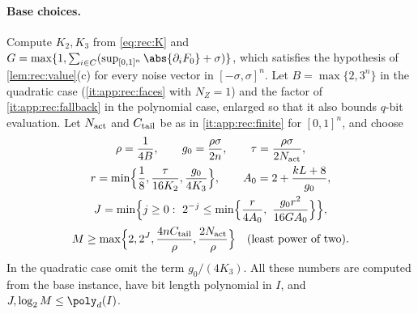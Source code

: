\paragraph{Base choices.}
Compute $K_2,K_3$ from \eqref{eq:rec:K} and
$G=\max\{1,\sum_{i\in C}(\sup_{[0,1]^n}\abs{\partial_iF_0}+\sigma)\}$, which
satisfies the hypothesis of \cref{lem:rec:value}(c) for every noise vector
in $[-\sigma,\sigma]^n$. Let $B=\max\{2,3^n\}$ in the quadratic case
(\ref{it:app:rec:faces} with $N_Z=1$) and the factor of \ref{it:app:rec:fallback} in the
polynomial case, enlarged so that it also bounds $q$-bit evaluation. Let
$N_{\rm act}$ and $C_{\rm tail}$ be as in \ref{it:app:rec:finite} for
$[0,1]^n$, and choose
\begin{equation}\label{eq:app:rec:params}
\begin{gathered}
 \rho=\frac1{4B},\qquad g_0=\frac{\rho\sigma}{2n},\qquad
 \tau=\frac{\rho\sigma}{2N_{\rm act}},\\
 r=\min\Bigl\{\frac18,\frac\tau{16K_2},\frac{g_0}{4K_3}\Bigr\},\qquad
 A_0=2+\frac{kL+8}{g_0},\\
 J=\min\Bigl\{j\ge0:\ 2^{-j}\le\min\Bigl\{\frac r{4A_0},\
 \frac{g_0r^2}{16GA_0}\Bigr\}\Bigr\},\\
 M\ge\max\Bigl\{2,2^J,\frac{4nC_{\rm tail}}\rho,
 \frac{2N_{\rm act}}\rho\Bigr\}\quad\text{(least power of two)}.
\end{gathered}
\end{equation}
In the quadratic case omit the term $g_0/(4K_3)$. All these numbers are
computed from the base instance, have bit length polynomial in $I$, and
$J,\log_2M\le\poly_d(I)$.

